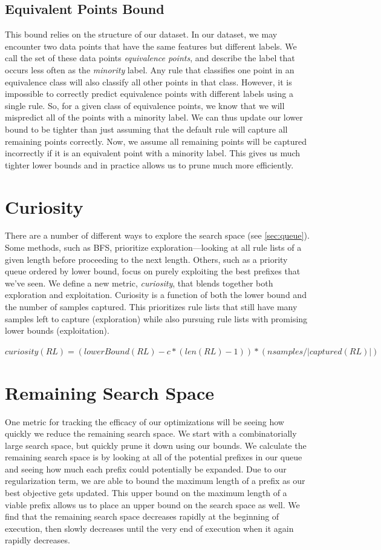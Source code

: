 \subsection{Equivalent Points Bound}
This bound relies on the structure of our dataset.
In our dataset, we may encounter two data points that have the same features but different labels.
We call the set of these data points \textit{equivalence points}, and describe the label that occurs less often as the \textit{minority} label.
Any rule that classifies one point in an equivalence class will also classify all other points in that class.
However, it is impossible to correctly predict equivalence points with different labels using a single rule.
So, for a given class of equivalence points, we know that we will mispredict all of the points with a minority label.
We can thus update our lower bound to be tighter than just assuming that the default rule will capture all remaining points correctly.
Now, we assume all remaining points will be captured incorrectly if it is an equivalent point with a minority label.
This gives us much tighter lower bounds and in practice allows us to prune much more efficiently.

\section{Curiosity}
There are a number of different ways to explore the search space (see \ref{sec:queue}).
Some methods, such as BFS, prioritize exploration---looking at all rule lists of a given length before proceeding to the next length.
Others, such as a priority queue ordered by lower bound, focus on purely exploiting the best prefixes that we've seen.
We define a new metric, \textit{curiosity}, that blends together both exploration and exploitation.
Curiosity is a function of both the lower bound and the number of samples captured.
This prioritizes rule lists that still have many samples left to capture (exploration) while also pursuing rule lists with promising lower bounds (exploitation).

\begin{math}
curiosity(RL) = (lowerBound(RL) - c * (len(RL) - 1))  * (nsamples / |captured(RL)|)
\end{math}

\section{Remaining Search Space}
One metric for tracking the efficacy of our optimizations will be seeing how quickly we reduce the remaining search space.
We start with a combinatorially large search space, but quickly prune it down using our bounds.
We calculate the remaining search space is by looking at all of the potential prefixes in our  queue and seeing how much each prefix could potentially be expanded.
Due to our regularization term, we are able to bound the maximum length of a prefix as our best objective gets updated.
This upper bound on the maximum length of a viable prefix allows us to place an upper bound on the search space as well.
We find that the remaining search space decreases rapidly at the beginning of execution, then slowly decreases until the very end of execution when it again rapidly decreases.